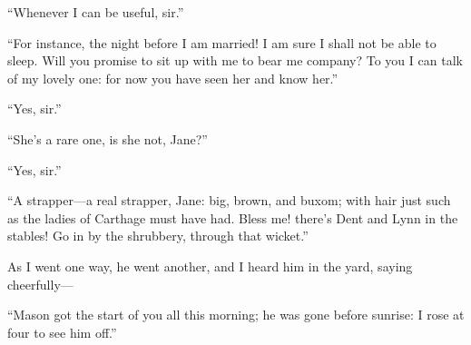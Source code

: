 \enquote{Whenever I can be useful, sir.}

\enquote{For instance, the night before I am married! I am sure I shall
not be able to sleep. Will you promise to sit up with me to bear me
company? To you I can talk of my lovely one: for now you have seen her
and know her.}

\enquote{Yes, sir.}

\enquote{She's a rare one, is she not, Jane?}

\enquote{Yes, sir.}

\enquote{A strapper---a real strapper, Jane: big, brown, and buxom; with
hair just such as the ladies of Carthage must have had. Bless me!
there's Dent and Lynn in the stables! Go in by the shrubbery, through
that wicket.}

As I went one way, he went another, and I heard him in the yard, saying
cheerfully---

\enquote{Mason got the start of you all this morning; he was gone before
sunrise: I rose at four to see him off.}
